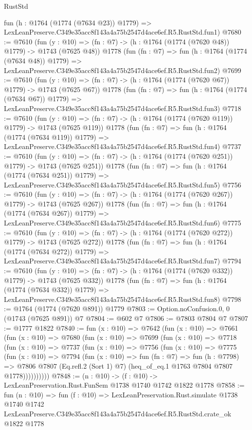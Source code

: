 \begin{lexlean}{RustStd}
\begin{coremodule}
    fun (h : @1764 (@1774 (@7634 @23)) @1779) =>
    LexLeanPreserve.C349e35acc8f143a4a75b2547d4ace6ef.R5.RustStd.fun1)
@7680 := @7610
    (fun (y : @10) => (fn : @7) -> (h : @1764 (@1774 (@7620 @48)) @1779) -> @1743 (@7625 @48))
    @1778
    (fun (fn : @7) =>
    fun (h : @1764 (@1774 (@7634 @48)) @1779) =>
    LexLeanPreserve.C349e35acc8f143a4a75b2547d4ace6ef.R5.RustStd.fun2)
@7699 := @7610
    (fun (y : @10) => (fn : @7) -> (h : @1764 (@1774 (@7620 @67)) @1779) -> @1743 (@7625 @67))
    @1778
    (fun (fn : @7) =>
    fun (h : @1764 (@1774 (@7634 @67)) @1779) =>
    LexLeanPreserve.C349e35acc8f143a4a75b2547d4ace6ef.R5.RustStd.fun3)
@7718 := @7610
    (fun (y : @10) => (fn : @7) -> (h : @1764 (@1774 (@7620 @119)) @1779) -> @1743 (@7625 @119))
    @1778
    (fun (fn : @7) =>
    fun (h : @1764 (@1774 (@7634 @119)) @1779) =>
    LexLeanPreserve.C349e35acc8f143a4a75b2547d4ace6ef.R5.RustStd.fun4)
@7737 := @7610
    (fun (y : @10) => (fn : @7) -> (h : @1764 (@1774 (@7620 @251)) @1779) -> @1743 (@7625 @251))
    @1778
    (fun (fn : @7) =>
    fun (h : @1764 (@1774 (@7634 @251)) @1779) =>
    LexLeanPreserve.C349e35acc8f143a4a75b2547d4ace6ef.R5.RustStd.fun5)
@7756 := @7610
    (fun (y : @10) => (fn : @7) -> (h : @1764 (@1774 (@7620 @267)) @1779) -> @1743 (@7625 @267))
    @1778
    (fun (fn : @7) =>
    fun (h : @1764 (@1774 (@7634 @267)) @1779) =>
    LexLeanPreserve.C349e35acc8f143a4a75b2547d4ace6ef.R5.RustStd.fun6)
@7775 := @7610
    (fun (y : @10) => (fn : @7) -> (h : @1764 (@1774 (@7620 @272)) @1779) -> @1743 (@7625 @272))
    @1778
    (fun (fn : @7) =>
    fun (h : @1764 (@1774 (@7634 @272)) @1779) =>
    LexLeanPreserve.C349e35acc8f143a4a75b2547d4ace6ef.R5.RustStd.fun7)
@7794 := @7610
    (fun (y : @10) => (fn : @7) -> (h : @1764 (@1774 (@7620 @332)) @1779) -> @1743 (@7625 @332))
    @1778
    (fun (fn : @7) =>
    fun (h : @1764 (@1774 (@7634 @332)) @1779) =>
    LexLeanPreserve.C349e35acc8f143a4a75b2547d4ace6ef.R5.RustStd.fun8)
@7798 := @1764 (@1774 (@7620 @891)) @1779
@7803 := Option.noConfusion.{0, 0} (@1743 (@7625 @891)) @7
@7804 := @602 @7
@7806 := @7803 @7804 @7
@7807 := @1777 @1822
@7840 := fun (x : @10) =>
  @7642
    (fun (x : @10) =>
    @7661
      (fun (x : @10) =>
      @7680
        (fun (x : @10) =>
        @7699
          (fun (x : @10) =>
          @7718
            (fun (x : @10) =>
            @7737
              (fun (x : @10) =>
              @7756
                (fun (x : @10) =>
                @7775
                  (fun (x : @10) =>
                  @7794
                    (fun (x : @10) =>
                    fun (fn : @7) =>
                    fun (h : @7798) =>
                    @7806
                      @7807
                      (Eq.refl.{2} (Sort 1) @7)
                      (heq_of_eq.{1} @1763 @7804 @7807 @1778))))))))))
@7848 := (n : @10) -> (f : @10) -> LexLeanPreservation.Rust.FunSem @1738 @1740 @1742 @1822 @1778
@7858 := fun (n : @10) =>
  fun (f : @10) =>
  LexLeanPreservation.Rust.simulate
    @1738
    @1740
    @1742
    LexLeanPreserve.C349e35acc8f143a4a75b2547d4ace6ef.R5.RustStd.crate_ok
    @1822
    @1778
\end{coremodule}
\end{lexlean}
